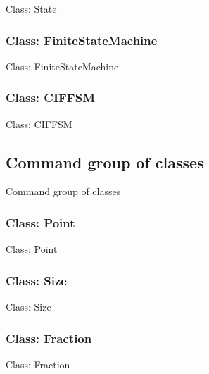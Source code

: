\documentclass[11pt,twoside,openany,x11names,svgnames]{memoir}
\begin{document}
Class: State

\subsubsection{Class: FiniteStateMachine}\label{Class-FiniteStateMachine}

Class: FiniteStateMachine

\subsubsection{Class: CIFFSM}\label{Class-CIFFSM}

Class: CIFFSM

\subsection{Command group of classes}\label{Command-group-of-classes}

Command group of classes

\subsubsection{Class: Point}\label{Class-Point}

Class: Point

\subsubsection{Class: Size}\label{Class-Size}

Class: Size

\subsubsection{Class: Fraction}\label{Class-Fraction}

Class: Fraction
\end{document}
